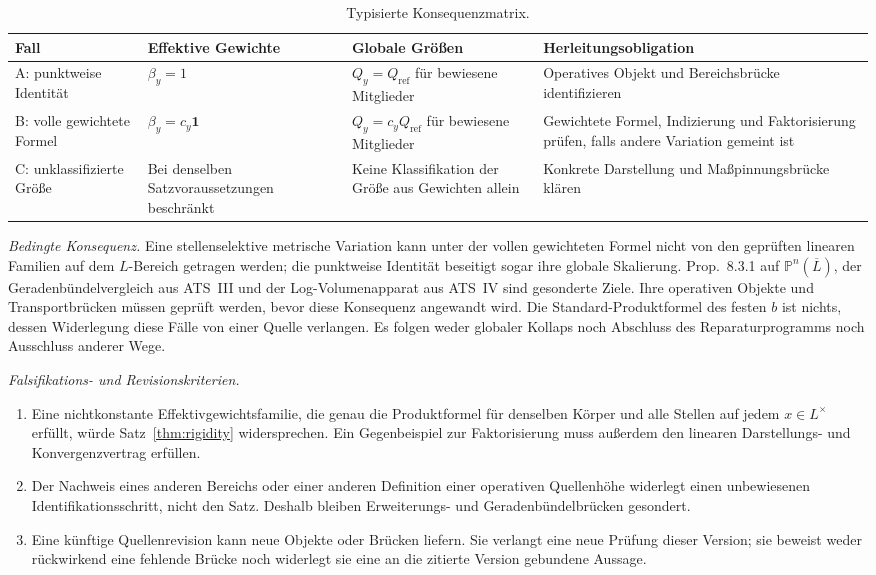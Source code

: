 \documentclass[11pt,a4paper]{article}
\theoremstyle{definition}
\theoremstyle{remark}
\begin{document}
\begin{table}[htbp]
\centering\small
\caption{Typisierte Konsequenzmatrix.}\label{tab:case_verdicts}
\begin{tabularx}{\textwidth}{@{}p{}XXX@{}}
\toprule
Fall & Effektive Gewichte & Globale Größen & Herleitungsobligation\\
\midrule
A: punktweise Identität & $\beta_y=1$ & $Q_y=Q_{\mathrm{ref}}$ für bewiesene Mitglieder & Operatives Objekt und Bereichsbrücke identifizieren\\
\addlinespace
B: volle gewichtete Formel & $\beta_y=c_y\mathbf1$ & $Q_y=c_yQ_{\mathrm{ref}}$ für bewiesene Mitglieder & Gewichtete Formel, Indizierung und Faktorisierung prüfen, falls andere Variation gemeint ist\\
\addlinespace
C: unklassifizierte Größe & Bei denselben Satzvoraussetzungen beschränkt & Keine Klassifikation der Größe aus Gewichten allein & Konkrete Darstellung und Maßpinnungsbrücke klären\\
\bottomrule
\end{tabularx}
\end{table}

\emph{Bedingte Konsequenz.} Eine stellenselektive metrische Variation kann
unter der vollen gewichteten Formel nicht von den geprüften linearen
Familien auf dem $L$-Bereich getragen werden; die punktweise Identität
beseitigt sogar ihre globale Skalierung.
Prop.~8.3.1 auf $\mathbb P^n(\overline L)$, der Geradenbündelvergleich
aus ATS~III und der Log-Volumenapparat aus ATS~IV sind gesonderte Ziele.
Ihre operativen Objekte und Transportbrücken müssen geprüft werden,
bevor diese Konsequenz angewandt wird. Die Standard-Produktformel des
festen $b$ ist nichts, dessen Widerlegung diese Fälle von einer Quelle
verlangen. Es folgen weder globaler Kollaps noch Abschluss des
Reparaturprogramms noch Ausschluss anderer Wege.

\emph{Falsifikations- und Revisionskriterien.}
\begin{enumerate}
\item Eine nichtkonstante Effektivgewichtsfamilie, die genau die Produktformel
für denselben Körper und alle Stellen auf jedem $x\in L^\times$ erfüllt,
würde Satz~\ref{thm:rigidity} widersprechen.
Ein Gegenbeispiel zur Faktorisierung muss außerdem den linearen
Darstellungs- und Konvergenzvertrag erfüllen.
\item Der Nachweis eines anderen Bereichs oder einer anderen Definition einer
operativen Quellenhöhe widerlegt einen unbewiesenen Identifikationsschritt,
nicht den Satz. Deshalb bleiben Erweiterungs- und Geradenbündelbrücken
gesondert.
\item Eine künftige Quellenrevision kann neue Objekte oder Brücken liefern.
Sie verlangt eine neue Prüfung dieser Version; sie beweist weder
rückwirkend eine fehlende Brücke noch widerlegt sie eine an die zitierte
Version gebundene Aussage.
\end{enumerate}
\end{document}
